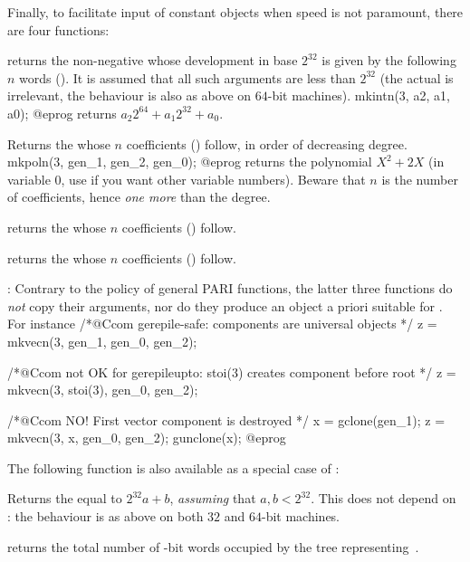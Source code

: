 Finally, to facilitate input of constant objects when speed is not paramount,
there are four  functions:

returns the non-negative  whose development in base $2^{32}$
is given by the following $n$ words (). It is assumed that
all such arguments are less than $2^{32}$ (the actual  is
irrelevant, the behaviour is also as above on $64$-bit machines).
\bprog
  mkintn(3, a2, a1, a0);
@eprog
\noindent returns $a_2 2^{64} + a_1 2^{32} + a_0$.

Returns the  whose $n$ coefficients () follow, in order of
decreasing degree.
\bprog
  mkpoln(3, gen_1, gen_2, gen_0);
@eprog
\noindent returns the polynomial $X^2 + 2X$ (in variable $0$, use
 if you want other variable numbers). Beware that $n$ is the
number of coefficients, hence \emph{one more} than the degree.

returns the  whose $n$ coefficients () follow.

returns the  whose $n$ coefficients () follow.

: Contrary to the policy of general PARI functions, the
latter three functions do \emph{not} copy their arguments, nor do they produce
an object a priori suitable for . For instance
\bprog
  /*@Ccom gerepile-safe: components are universal objects */
  z = mkvecn(3, gen_1, gen_0, gen_2);

  /*@Ccom not OK for gerepileupto: stoi(3) creates component before root */
  z = mkvecn(3, stoi(3), gen_0, gen_2);

  /*@Ccom NO! First vector component  is destroyed */
  x = gclone(gen_1);
  z = mkvecn(3, x, gen_0, gen_2);
  gunclone(x);
@eprog

\noindent The following function is also available as a special case of
:


Returns the  equal to $2^{32} a + b$, \emph{assuming} that
$a,b < 2^{32}$. This does not depend on : the behaviour is
as above on both $32$ and $64$-bit machines.


 returns the total number of \B-bit words occupied
by the tree representing~.


